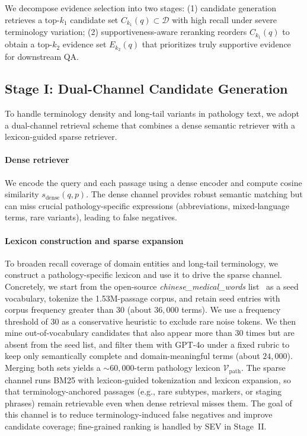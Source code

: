 \documentclass[preprint,12pt,a4paper]{elsarticle}
\begin{document}
We decompose evidence selection into two stages:
(1) candidate generation retrieves a top-$k_1$ candidate set $C_{k_1}(q)\subset \mathcal{D}$ with high recall under severe terminology variation;
(2) supportiveness-aware reranking reorders $C_{k_1}(q)$ to obtain a top-$k_2$ evidence set $E_{k_2}(q)$ that prioritizes truly supportive evidence for downstream QA.

\subsection{Stage I: Dual-Channel Candidate Generation}
\label{sec:method:cand}
To handle terminology density and long-tail variants in pathology text, we adopt a dual-channel retrieval scheme that combines a dense semantic retriever with a lexicon-guided sparse retriever.

\paragraph{Dense retriever}
We encode the query and each passage using a dense encoder and compute cosine similarity
$s_{\text{dense}}(q,p)$.
The dense channel provides robust semantic matching but can miss crucial pathology-specific expressions (abbreviations, mixed-language terms, rare variants), leading to false negatives.

\paragraph{Lexicon construction and sparse expansion}
To broaden recall coverage of domain entities and long-tail terminology, we construct a pathology-specific lexicon and use it to drive the sparse channel.
Concretely, we start from the open-source \emph{chinese\_medical\_words} list~\cite{xtea_chinese_medical_words} as a seed vocabulary, tokenize the 1.53M-passage corpus, and retain seed entries with corpus frequency greater than 30 (about $36{,}000$ terms). We use a frequency threshold of 30 as a conservative heuristic to exclude rare noise tokens.
We then mine out-of-vocabulary candidates that also appear more than 30 times but are absent from the seed list, and filter them with GPT\textnormal{-}4o under a fixed rubric to keep only semantically complete and domain-meaningful terms (about $24{,}000$).
Merging both sets yields a $\sim\!60{,}000$-term pathology lexicon $\mathcal{V}_{\text{path}}$.
The sparse channel runs BM25 with lexicon-guided tokenization and lexicon expansion, so that terminology-anchored passages (e.g., rare subtypes, markers, or staging phrases) remain retrievable even when dense retrieval misses them.
The goal of this channel is to reduce terminology-induced false negatives and improve candidate coverage; fine-grained ranking is handled by SEV in Stage~II.
\end{document}
